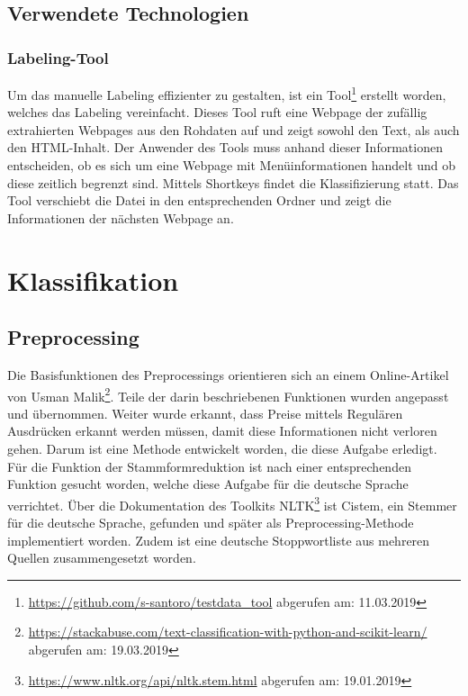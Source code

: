 \subsection{Verwendete Technologien}
\subsubsection{Labeling-Tool}
Um das manuelle Labeling effizienter zu gestalten, ist ein Tool\footnote{\url{https://github.com/s-santoro/testdata_tool} abgerufen am: 11.03.2019} erstellt worden, welches das Labeling vereinfacht.
Dieses Tool ruft eine Webpage der zufällig extrahierten Webpages aus den Rohdaten auf und zeigt sowohl den Text, als auch den HTML-Inhalt.
Der Anwender des Tools muss anhand dieser Informationen entscheiden, ob es sich um eine Webpage mit Menüinformationen handelt und ob diese zeitlich begrenzt sind.
Mittels Shortkeys findet die Klassifizierung statt.
Das Tool verschiebt die Datei in den entsprechenden Ordner und zeigt die Informationen der nächsten Webpage an.
\section{Klassifikation}
\subsection{Preprocessing}
Die Basisfunktionen des Preprocessings orientieren sich an einem Online-Artikel von Usman Malik\footnote{\url{https://stackabuse.com/text-classification-with-python-and-scikit-learn/} abgerufen am: 19.03.2019}.
Teile der darin beschriebenen Funktionen wurden angepasst und übernommen.
Weiter wurde erkannt, dass Preise mittels Regulären Ausdrücken erkannt werden müssen, damit diese Informationen nicht verloren gehen.
Darum ist eine Methode entwickelt worden, die diese Aufgabe erledigt.
Für die Funktion der Stammformreduktion ist nach einer entsprechenden Funktion gesucht worden, welche diese Aufgabe für die deutsche Sprache verrichtet.
Über die Dokumentation des Toolkits NLTK\footnote{\url{https://www.nltk.org/api/nltk.stem.html} abgerufen am: 19.01.2019} ist Cistem, ein Stemmer für die deutsche Sprache, gefunden und später als Preprocessing-Methode implementiert worden.
Zudem ist eine deutsche Stoppwortliste aus mehreren Quellen zusammengesetzt worden.

